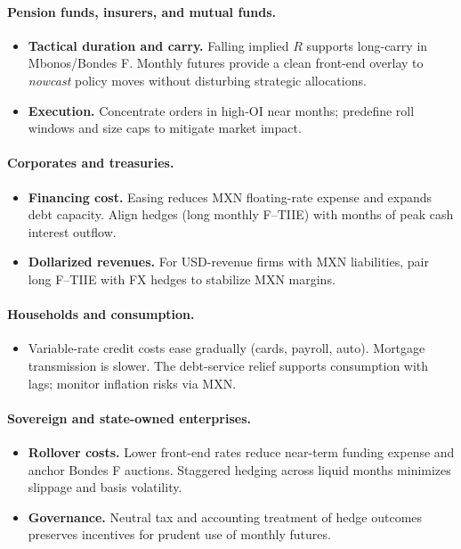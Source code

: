 \documentclass[11pt,a4paper]{article} %
\begin{document}
\paragraph{Pension funds, insurers, and mutual funds.}
\begin{itemize}
  \item \textbf{Tactical duration and carry.} Falling implied $R$ supports long-carry in Mbonos/Bondes F. Monthly futures provide a clean front-end overlay to \emph{nowcast} policy moves without disturbing strategic allocations.
  \item \textbf{Execution.} Concentrate orders in high-OI near months; predefine roll windows and size caps to mitigate market impact.
\end{itemize}

\paragraph{Corporates and treasuries.}
\begin{itemize}
  \item \textbf{Financing cost.} Easing reduces MXN floating-rate expense and expands debt capacity. Align hedges (long monthly F--TIIE) with months of peak cash interest outflow.
  \item \textbf{Dollarized revenues.} For USD-revenue firms with MXN liabilities, pair long F--TIIE with FX hedges to stabilize MXN margins.
\end{itemize}

\paragraph{Households and consumption.}
\begin{itemize}
  \item Variable-rate credit costs ease gradually (cards, payroll, auto). Mortgage transmission is slower. The debt-service relief supports consumption with lags; monitor inflation risks via MXN.
\end{itemize}

\paragraph{Sovereign and state-owned enterprises.}
\begin{itemize}
  \item \textbf{Rollover costs.} Lower front-end rates reduce near-term funding expense and anchor Bondes F auctions. Staggered hedging across liquid months minimizes slippage and basis volatility.
  \item \textbf{Governance.} Neutral tax and accounting treatment of hedge outcomes preserves incentives for prudent use of monthly futures.
\end{itemize}
\end{document}
